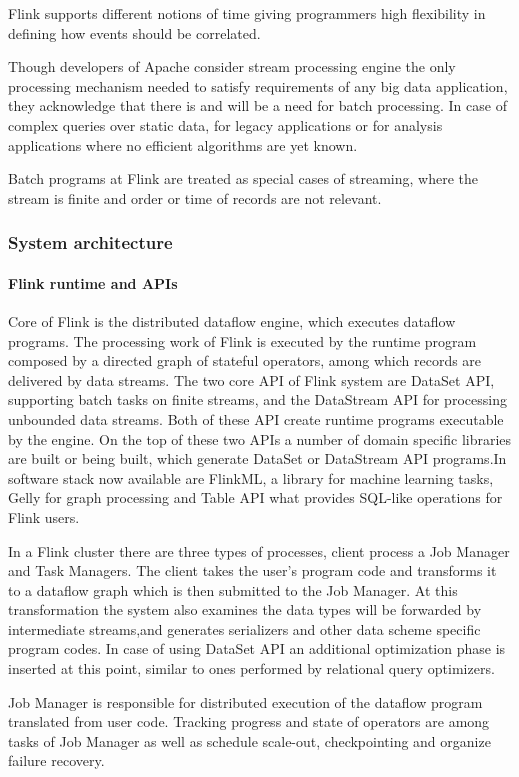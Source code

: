 Flink supports different notions of time giving programmers high flexibility in defining how events should be correlated.

Though developers of Apache consider stream processing engine the only processing mechanism needed to satisfy requirements of any big data application, they acknowledge that there is and will be a need for batch processing. In case of complex queries over static data, for legacy applications or for analysis applications where no efficient  algorithms  are yet known.

Batch programs at Flink are treated as special cases of streaming, where the stream is finite and order or time of records are not relevant.
\subsubsection{System architecture} 
\paragraph{Flink runtime and APIs}
Core of Flink is the distributed dataflow engine, which executes dataflow programs. The processing work of Flink is executed by the runtime program composed by a directed graph of stateful operators, among which records are delivered by data streams. The two core API of Flink system are DataSet API, supporting batch tasks on finite streams, and the DataStream API  for processing unbounded data streams. Both of these API create runtime programs executable by the engine.
On the top of these two APIs a number of domain specific libraries are built or being built, which generate DataSet or DataStream  API programs.In software stack now available are FlinkML, a library for machine learning tasks, Gelly for graph processing and Table API what provides SQL-like operations for Flink users.

In a Flink cluster there are three types of processes, client process a Job Manager and Task Managers. The client takes the user's program code and transforms it to a dataflow graph which is then submitted to the Job Manager. At this transformation the system also examines the data types will be forwarded by intermediate streams,and generates serializers and other data scheme specific program codes. In case of using DataSet API an additional optimization phase is inserted at this point, similar to ones performed by relational query optimizers.

Job Manager is responsible for distributed execution of the dataflow program translated from user code. Tracking progress and state of operators are among tasks of Job Manager as well as schedule scale-out, checkpointing and organize failure recovery.

